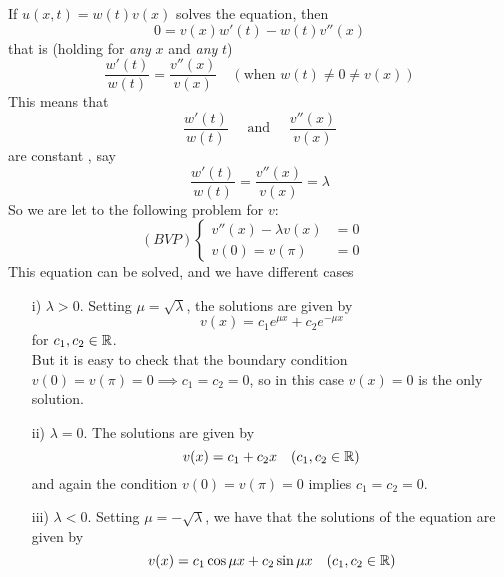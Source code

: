 \begin{enumerate}
    If $u(x,t) = w(t) v(x)$ solves the equation, then
    \begin{equation*}
        0 = v(x) w'(t) - w(t) v''(x)
    \end{equation*}
    that is (holding for \emph{any} $x$ and \emph{any} $t$)
    \begin{equation*}
        \frac{w'(t)}{w(t)}=\frac{v''(x)}{v(x)} \quad (\text{when } w(t) \neq 0 \neq v(x))
    \end{equation*}
    This means that 
    \begin{equation*}
        \frac{w'(t)}{w(t)} \quad \text{ and } \quad \frac{v''(x)}{v(x)}
    \end{equation*}
    are constant , say
    \begin{equation*}
        \frac{w'(t)}{w(t)} = \frac{v''(x)}{v(x)} = \lambda
    \end{equation*}
    So we are let to the following problem for $v$:
    \begin{equation*}
    (BVP)
        \begin{cases}
            v''(x)-\lambda v(x) &= 0 \quad \\
            v(0) = v(\pi) &= 0
        \end{cases}
    \end{equation*}
    This equation can be solved, and we have different cases
    \begin{itemize}
        \item [i)] $\lambda > 0$. Setting $\mu = \sqrt{\lambda}$, the solutions are given by 
        \begin{equation*}
            v(x) = c_1 e^{\mu x} + c_2 e^{-\mu x}
        \end{equation*}
        for $c_1,c_2 \in \mathbb{R}$. \\
        But it is easy to check that the boundary condition $v(0) = v(\pi) = 0 \implies c_1=c_2 = 0$, so in this case $v(x) = 0$ is the only solution. 
        \item [ii)] $\lambda = 0$. The solutions are given by 
        \begin{equation*}
            v(x) = c_1 + c_2 x \quad (c_1,c_2 \in \mathbb{R})
        \end{equation*}
        and again the condition $v(0) = v(\pi) = 0$ implies $c_1 = c_2 = 0$.
        \item [iii)] $\lambda < 0$. Setting $\mu = -\sqrt{\lambda}$, we have that the solutions of the equation are given by 
        \begin{equation*}
            v(x) = c_1 \cos \mu x + c_2 \sin \mu x \quad (c_1,c_2 \in \mR)

\end{equation*}
\end{itemize}
\end{enumerate}
